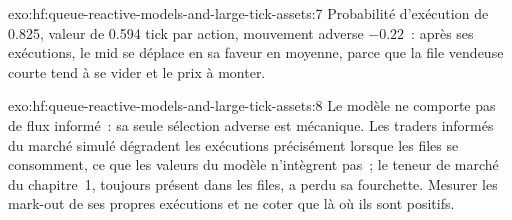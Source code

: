 \begin{solution}{exo:hf:queue-reactive-models-and-large-tick-assets:7}
Probabilité d'exécution de 0.825, valeur de 0.594 tick par action, mouvement adverse $-0.22$~: après ses exécutions, le mid se déplace en sa faveur en moyenne, parce que la
file vendeuse courte tend à se vider et le prix à monter.
\end{solution}

\begin{solution}{exo:hf:queue-reactive-models-and-large-tick-assets:8}
Le modèle ne comporte pas de flux informé~: sa seule sélection adverse est mécanique. Les traders informés du marché simulé dégradent les exécutions précisément lorsque
les files se consomment, ce que les valeurs du modèle n'intègrent pas~; le teneur de marché du chapitre~1, toujours présent dans les files, a perdu sa fourchette. Mesurer les mark-out de
ses propres exécutions et ne coter que là où ils sont positifs.
\end{solution}

